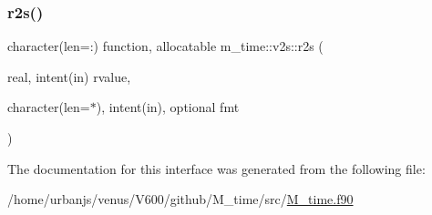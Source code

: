 \mbox{\label{interfacem__time_1_1v2s_a5bc519244bd303a3dbad639743c0cff2}} 
\subsubsection{\texorpdfstring{r2s()}{r2s()}}
{\footnotesize\ttfamily character(len=\+:) function, allocatable m\+\_\+time\+::v2s\+::r2s (\begin{DoxyParamCaption}\item[{real, intent(in)}]{rvalue,  }\item[{character(len=$\ast$), intent(in), optional}]{fmt }\end{DoxyParamCaption})\hspace{0.3cm}{\ttfamily [private]}}



The documentation for this interface was generated from the following file\+:\begin{DoxyCompactItemize}
\item 
/home/urbanjs/venus/\+V600/github/\+M\+\_\+time/src/\mbox{\hyperlink{M__time_8f90}{M\+\_\+time.\+f90}}\end{DoxyCompactItemize}
